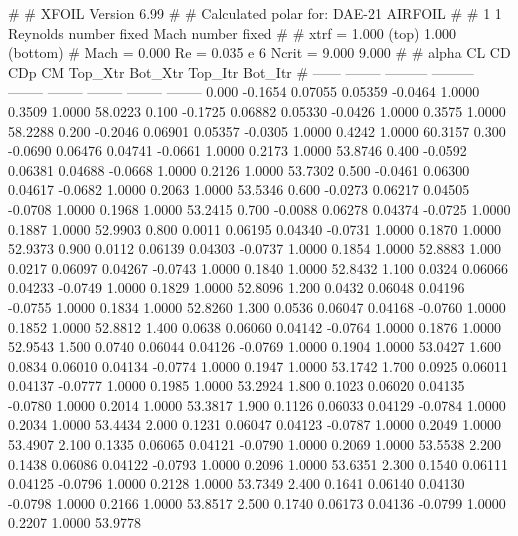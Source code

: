 #  
#       XFOIL         Version 6.99
#  
# Calculated polar for: DAE-21 AIRFOIL                                  
#  
# 1 1 Reynolds number fixed          Mach number fixed         
#  
# xtrf =   1.000 (top)        1.000 (bottom)  
# Mach =   0.000     Re =     0.035 e 6     Ncrit =   9.000  9.000
#  
#   alpha    CL        CD       CDp       CM     Top_Xtr  Bot_Xtr  Top_Itr  Bot_Itr
#  ------ -------- --------- --------- -------- -------- -------- -------- --------
   0.000  -0.1654   0.07055   0.05359  -0.0464   1.0000   0.3509   1.0000  58.0223
   0.100  -0.1725   0.06882   0.05330  -0.0426   1.0000   0.3575   1.0000  58.2288
   0.200  -0.2046   0.06901   0.05357  -0.0305   1.0000   0.4242   1.0000  60.3157
   0.300  -0.0690   0.06476   0.04741  -0.0661   1.0000   0.2173   1.0000  53.8746
   0.400  -0.0592   0.06381   0.04688  -0.0668   1.0000   0.2126   1.0000  53.7302
   0.500  -0.0461   0.06300   0.04617  -0.0682   1.0000   0.2063   1.0000  53.5346
   0.600  -0.0273   0.06217   0.04505  -0.0708   1.0000   0.1968   1.0000  53.2415
   0.700  -0.0088   0.06278   0.04374  -0.0725   1.0000   0.1887   1.0000  52.9903
   0.800   0.0011   0.06195   0.04340  -0.0731   1.0000   0.1870   1.0000  52.9373
   0.900   0.0112   0.06139   0.04303  -0.0737   1.0000   0.1854   1.0000  52.8883
   1.000   0.0217   0.06097   0.04267  -0.0743   1.0000   0.1840   1.0000  52.8432
   1.100   0.0324   0.06066   0.04233  -0.0749   1.0000   0.1829   1.0000  52.8096
   1.200   0.0432   0.06048   0.04196  -0.0755   1.0000   0.1834   1.0000  52.8260
   1.300   0.0536   0.06047   0.04168  -0.0760   1.0000   0.1852   1.0000  52.8812
   1.400   0.0638   0.06060   0.04142  -0.0764   1.0000   0.1876   1.0000  52.9543
   1.500   0.0740   0.06044   0.04126  -0.0769   1.0000   0.1904   1.0000  53.0427
   1.600   0.0834   0.06010   0.04134  -0.0774   1.0000   0.1947   1.0000  53.1742
   1.700   0.0925   0.06011   0.04137  -0.0777   1.0000   0.1985   1.0000  53.2924
   1.800   0.1023   0.06020   0.04135  -0.0780   1.0000   0.2014   1.0000  53.3817
   1.900   0.1126   0.06033   0.04129  -0.0784   1.0000   0.2034   1.0000  53.4434
   2.000   0.1231   0.06047   0.04123  -0.0787   1.0000   0.2049   1.0000  53.4907
   2.100   0.1335   0.06065   0.04121  -0.0790   1.0000   0.2069   1.0000  53.5538
   2.200   0.1438   0.06086   0.04122  -0.0793   1.0000   0.2096   1.0000  53.6351
   2.300   0.1540   0.06111   0.04125  -0.0796   1.0000   0.2128   1.0000  53.7349
   2.400   0.1641   0.06140   0.04130  -0.0798   1.0000   0.2166   1.0000  53.8517
   2.500   0.1740   0.06173   0.04136  -0.0799   1.0000   0.2207   1.0000  53.9778
